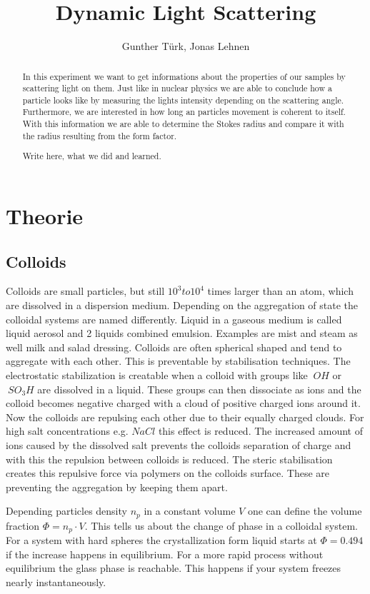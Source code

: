 \documentclass[]{article}
\title{Dynamic Light Scattering}
\author{Gunther T\"urk, Jonas Lehnen}
\begin{document}
\maketitle
\tableofcontents
\begin{abstract}
In this experiment we want to get informations about the properties of our samples by scattering light on them. Just like in nuclear physics we are able to conclude how a particle looks like by measuring the lights intensity depending on the scattering angle. Furthermore, we are interested in how long an particles movement is coherent to itself. With this information we are able to determine the Stokes radius and compare it with the radius resulting from the form factor.


Write here, what we did and learned.
\end{abstract}


\section{Theorie}
\subsection{Colloids}
Colloids are small particles, but still $10^3 to 10^4$ times larger than an atom, which are dissolved in a dispersion medium. Depending on the aggregation of state the colloidal systems are named differently. Liquid in a gaseous medium is called liquid aerosol and 2 liquids combined emulsion. Examples are mist and steam as well milk and salad dressing.
Colloids are often spherical shaped and tend to aggregate with each other. This is preventable by stabilisation techniques. The electrostatic stabilization is creatable when a colloid with groups like $~OH$ or $~SO_3H$ are dissolved in a liquid. These groups  can then dissociate as ions and the colloid becomes negative charged with a cloud of positive charged ions around it. Now the colloids are repulsing each other due to their equally charged clouds. For high salt concentrations e.g. $NaCl$ this effect is reduced. The increased amount of ions caused by the dissolved salt prevents the colloids separation of charge and with this the repulsion between colloids is reduced. 
The steric stabilisation creates this repulsive force via polymers on the colloids surface. These are preventing the aggregation by keeping them apart.

Depending particles density $n_p$ in a constant volume $V$ one can define the volume fraction $\Phi = n_p \cdot V$. This tells us about the change of phase in a colloidal system. For a system with hard spheres the crystallization form liquid starts at $\Phi=0.494$ if the increase happens in equilibrium. For a more rapid process without equilibrium the glass phase is reachable. This happens if your system freezes nearly instantaneously.  
\end{document}
